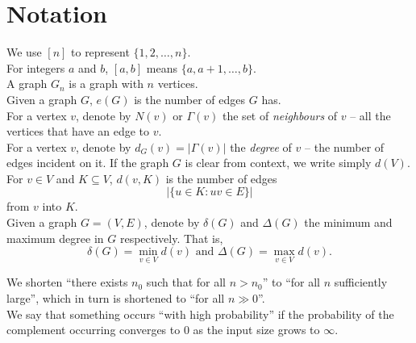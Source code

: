 \section{Notation}
	We use $[n]$ to represent $\{1,2,\ldots,n\}$.\\

	For integers $a$ and $b$, $[a,b]$ means $\{a,a+1,\ldots,b\}$.\\

	A graph $G_n$ is a graph with $n$ vertices.\\

	Given a graph $G$, $e(G)$ is the number of edges $G$ has.\\

	For a vertex $v$, denote by $N(v)$ or $\Gamma(v)$ the set of \emph{neighbours} of $v$ -- all the vertices that have an edge to $v$.\\

	For a vertex $v$, denote by $d_G(v) = |\Gamma(v)|$ the \emph{degree} of $v$ -- the number of edges incident on it. If the graph $G$ is clear from context, we write simply $d(V)$. \\
	
	For $v \in V$ and $K \subseteq V$, $d(v,K)$ is the number of edges
	\[ \left|\{ u \in K : uv \in E \}\right| \]
	from $v$ into $K$.\\
	
	Given a graph $G = (V,E)$, denote by $\delta(G)$ and $\Delta(G)$ the minimum and maximum degree in $G$ respectively. That is,
	\[ \delta(G) = \min_{v \in V} d(v) \text{ and } \Delta(G) = \max_{v \in V} d(v). \]

	We shorten ``there exists $n_0$ such that for all $n > n_0$'' to ``for all $n$ sufficiently large'', which in turn is shortened to ``for all $n\gg 0$''.\\

	We say that something occurs ``with high probability'' if the probability of the complement occurring converges to $0$ as the input size grows to $\infty$.

\clearpage